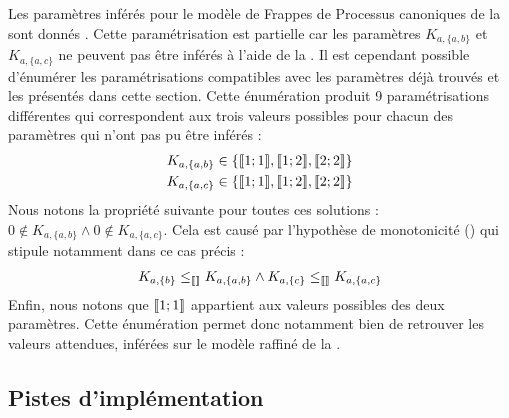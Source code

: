\begin{example}
  Les paramètres inférés pour le modèle de Frappes de Processus canoniques de la
   sont donnés .
  Cette paramétrisation est partielle car les paramètres
  $K_{a,\{a,b\}}$ et $K_{a,\{a,c\}}$ ne peuvent pas être inférés à l'aide de la
  .
  Il est cependant possible d'énumérer les paramétrisations compatibles avec les paramètres
  déjà trouvés et les \enumparamcr
  présentés dans cette section.
  Cette énumération produit 9 paramétrisations différentes qui correspondent aux
  trois valeurs possibles pour chacun des paramètres qui n'ont pas pu être inférés :
  \begin{align*}
    K_{a,\{a,b\}} &\in \{ \mathopen{\llbracket}1\mathclose{};1\mathclose{\rrbracket}, \mathopen{\llbracket}1\mathclose{};2\mathclose{\rrbracket}, \mathopen{\llbracket}2\mathclose{};2\mathclose{\rrbracket} \} \\
    K_{a,\{a,c\}} &\in \{ \mathopen{\llbracket}1\mathclose{};1\mathclose{\rrbracket}, \mathopen{\llbracket}1\mathclose{};2\mathclose{\rrbracket}, \mathopen{\llbracket}2\mathclose{};2\mathclose{\rrbracket} \}
  \end{align*}
  Nous notons la propriété suivante pour toutes ces solutions :
  $0 \notin K_{a,\{a,b\}} \wedge 0 \notin K_{a,\{a,c\}}$.
  Cela est causé par l'hypothèse de monotonicité ()
  qui stipule notamment dans ce cas précis :
  \begin{align*}
    K_{a,\{b\}} \leq_{\llbracket\rrbracket} K_{a,\{a,b\}} \wedge
    K_{a,\{c\}} \leq_{\llbracket\rrbracket} K_{a,\{a,c\}}
  \end{align*}
  Enfin, nous notons que $\mathopen{\llbracket}1\mathclose{};1\mathclose{\rrbracket}$ appartient aux valeurs possibles des deux paramètres.
  Cette énumération permet donc notamment bien de retrouver les valeurs attendues,
  inférées sur le modèle raffiné de la .
\end{example}



\subsection{Pistes d'implémentation}

\newcommand{\atom}[1]{#1}
\newcommand{\predicate}[1]{\mathit{#1}}
\newcommand{\la}{\leftarrow}
\newcommand{\var}[1]{#1}
\newcommand{\nota}{\neg}

\newcommand{\paramlabel}{\predicate{param\_label}}
\newcommand{\paramres}{\predicate{param\_resource}}
\newcommand{\component}{\predicate{component}}
\newcommand{\componentlevels}{\predicate{component\_levels}}
\newcommand{\param}{\predicate{param}}
\newcommand{\inferedparam}{\predicate{infered\_param}}
\newcommand{\lessactive}{\predicate{less\_active}}
\newcommand{\paraminf}{\predicate{param\_inf}}

